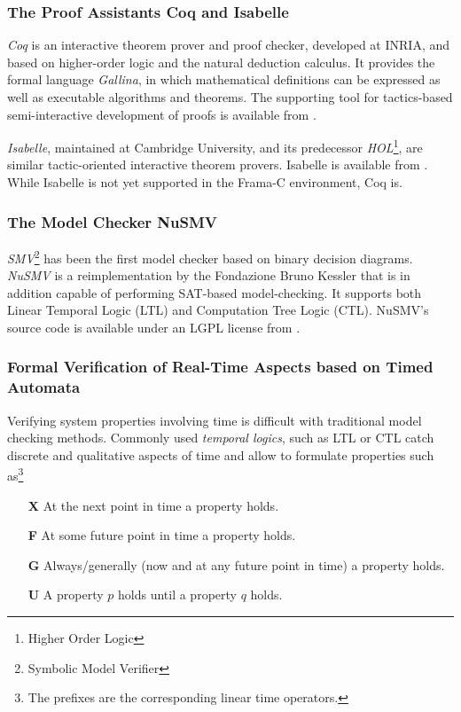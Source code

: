 \documentclass{template/openetcs_report}
\begin{document}
\subsubsection{The Proof Assistants Coq and Isabelle}


{\em Coq} is an interactive theorem prover and proof checker,
developed at INRIA, and based on
higher-order logic and the natural deduction calculus.
%
It provides the formal language {\em Gallina}, in which
mathematical definitions can be expressed as well as
executable algorithms and theorems.
%
The supporting tool for tactics-based semi-interactive development of
proofs is available from \cite{coq}.
%

{\em Isabelle}, maintained at Cambridge University,
and its predecessor {\em HOL}\footnote{
        Higher Order Logic
},
are similar tactic-oriented interactive theorem provers.
%
Isabelle is available from \cite{isabelle}.
%
While Isabelle is not yet supported in the Frama-C environment,
Coq is.


\subsubsection{The Model Checker NuSMV}

{\em SMV}\footnote{
        Symbolic Model Verifier
}
has been the first model checker based on binary decision
diagrams.
%
{\em NuSMV} is a reimplementation by the Fondazione Bruno Kessler
that is in addition capable of
performing SAT-based model-checking.
%
It supports both
Linear Temporal Logic (LTL) and Computation Tree Logic (CTL).
%
NuSMV's source code is available under an LGPL license from
\cite{nusmv}.


\subsubsection{Formal Verification of Real-Time Aspects based on Timed Automata}

Verifying system properties involving time is difficult with traditional model checking methods. Commonly used \emph{temporal logics}, such as LTL or CTL catch discrete and qualitative aspects of time and allow to formulate properties such as\footnote{The prefixes are the corresponding linear time operators.}
\begin{itemize}
  \item[\bf X] At the next point in time a property holds.
  \item[\bf F] At some future point in time a property holds.
  \item[\bf G] Always/generally (now and at any future point in time) a property holds.
  \item[\bf U] A property $p$ holds until a property $q$ holds.
\end{itemize}
\end{document}
